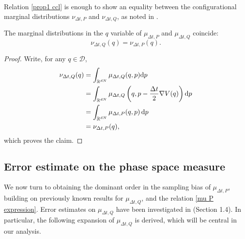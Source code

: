 Relation \eqref{prop1 ccl} is enough to show an equality between the configurational marginal distributions $\nu_{\Delta t,P}$ and $\nu_{\Delta t,Q}$, as noted in \cite{KK22}.
\begin{corollary}\label{corr marginal equality}
  The marginal distributions in the $q$ variable of $\mu_{\Delta t,P}$ and $\mu_{\Delta t,Q}$ coincide:
  \begin{equation}
    \label{marginal distributions equality}
    \nu_{\Delta t,Q}(q)= \nu_{\Delta t,P}(q).
  \end{equation}
\end{corollary}
\begin{proof}
  Write, for any $q\in \mathcal D$,
  \begin{equation*}
    \label{corrolary 1 proof}
    \begin{aligned}
    \nu_{\Delta t,Q}(q) &= \int_{\mathbb{R}^{dN}}\mu_{\Delta t,Q}(q,p)\mathrm{d}p\\
    &=\int_{\mathbb{R}^{dN}}\mu_{\Delta t,Q}\left(q,p-\frac{\Delta t}2 \nabla V(q)\right)\mathrm{d}p\\
    &=\int_{\mathbb{R}^{dN}}\mu_{\Delta t,P}(q,p)\,\mathrm{d}p\\
    &= \nu_{\Delta t,P}(q),
    \end{aligned}
  \end{equation*}
  which proves the claim.
\end{proof}


\subsection{Error estimate on the phase space measure}\label{BAOA first order estimate}

We now turn to obtaining the dominant order in the sampling bias of $\mu_{\Delta t,P}$, building on previously known results for $\mu_{\Delta t,Q}$, and the relation \eqref{mu P expression}.
Error estimates on $\mu_{\Delta t,Q}$ have been investigated in \cite{LMS13} (Section 1.4). In particular, the following expansion of $\mu_{\Delta t,Q}$ is derived, which will be central in our analysis.

